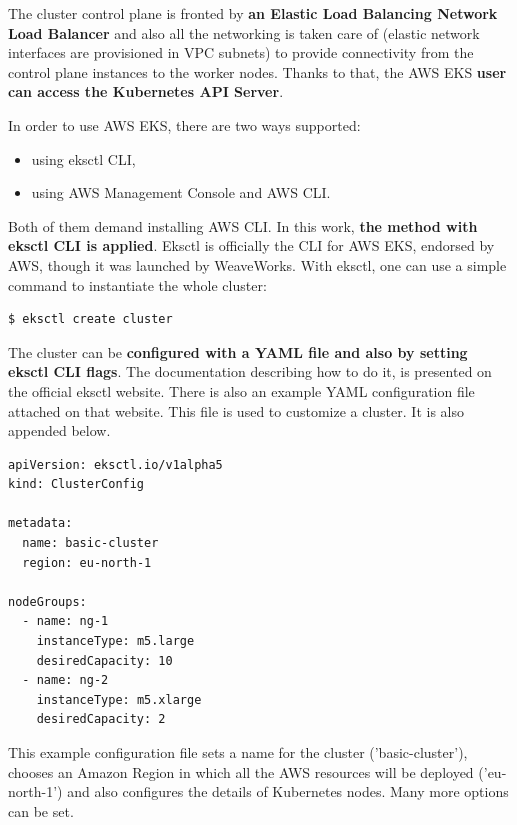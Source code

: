 The cluster control plane is fronted by \textbf{an Elastic Load Balancing Network Load Balancer} and also all the networking is taken care of (elastic network interfaces are provisioned in VPC subnets) to provide connectivity from the control plane instances to the worker nodes. Thanks to that, the AWS EKS \textbf{user can access the Kubernetes API Server}\cite{eks-clusters}.

In order to use AWS EKS, there are two ways supported:
\begin{itemize}
\item using eksctl CLI,
\item using AWS Management Console and AWS CLI.
\end{itemize}

Both of them demand installing AWS CLI. In this work, \textbf{the method with eksctl CLI is applied}. Eksctl is officially the CLI for AWS EKS, endorsed by AWS, though it was launched by WeaveWorks. With eksctl, one can use a simple command to instantiate the whole cluster\cite{eks-cli-official}:
\begin{lstlisting}[basicstyle=\small,caption={A command of eksctl CLI tool used to create a Kubernetes cluster},captionpos=b,language=Bash,xleftmargin=1cm]
$ eksctl create cluster
\end{lstlisting}

The cluster can be \textbf{configured with a YAML file and also by setting eksctl CLI flags}. The documentation describing how to do it, is presented on the official eksctl website\cite{eksctl}. There is also an example YAML configuration file attached on that website. This file is used to customize a cluster. It is also appended below.

\begin{lstlisting}[basicstyle=\tiny,caption={An example YAML file used to customize a Kubernetes cluster created with eksctl CLI tool\cite{eksctl}},captionpos=b,language=Bash,xleftmargin=1cm]
apiVersion: eksctl.io/v1alpha5
kind: ClusterConfig

metadata:
  name: basic-cluster
  region: eu-north-1

nodeGroups:
  - name: ng-1
    instanceType: m5.large
    desiredCapacity: 10
  - name: ng-2
    instanceType: m5.xlarge
    desiredCapacity: 2
\end{lstlisting}

This example configuration file sets a name for the cluster ('basic-cluster'), chooses an Amazon Region in which all the AWS resources will be deployed ('eu-north-1') and also configures the details of Kubernetes nodes. Many more options can be set.

